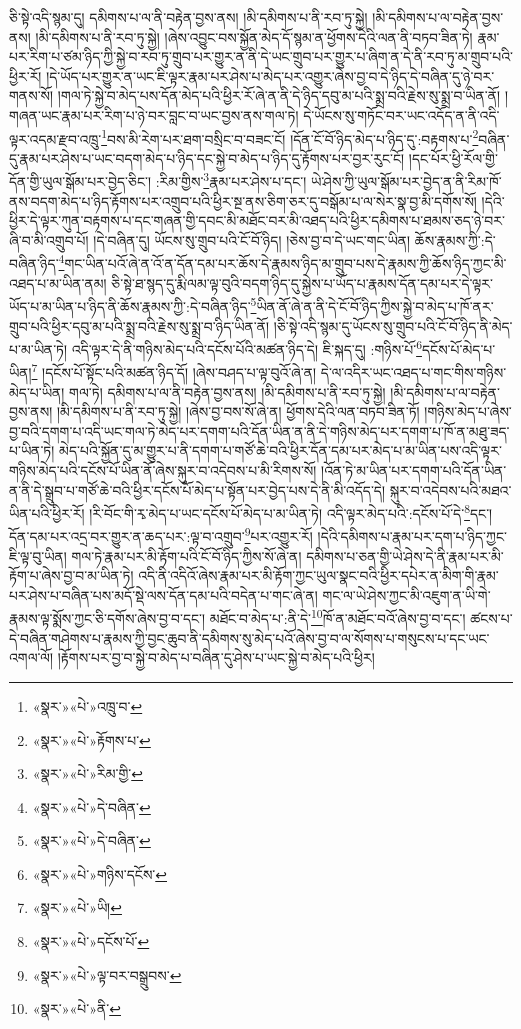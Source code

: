 ཅི་སྟེ་འདི་སྙམ་དུ། དམིགས་པ་ལ་ནི་བརྟེན་བྱས་ནས། །མི་དམིགས་པ་ནི་རབ་ཏུ་སྐྱེ། །མི་དམིགས་པ་ལ་བརྟེན་བྱས་ནས། །མི་དམིགས་པ་ནི་རབ་ཏུ་སྐྱེ། །ཞེས་འབྱུང་བས་སྐྱོན་མེད་དོ་སྙམ་ན་ཕྱོགས་དེའི་ལན་ནི་བཏབ་ཟིན་ཏེ། རྣམ་པར་རིག་པ་ཙམ་ཉིད་ཀྱི་སྐྱེ་བ་རབ་ཏུ་གྲུབ་པར་གྱུར་ན་ནི་དེ་ཡང་གྲུབ་པར་གྱུར་པ་ཞིག་ན་དེ་ནི་རབ་ཏུ་མ་གྲུབ་པའི་ཕྱིར་རོ། །དེ་ཡོད་པར་གྱུར་ན་ཡང་ཇི་ལྟར་རྣམ་པར་ཤེས་པ་མེད་པར་འགྱུར་ཞེས་བྱ་བ་དེ་ཉིད་དེ་བཞིན་དུ་ཉེ་བར་གནས་སོ། །གལ་ཏེ་སྐྱེ་བ་མེད་པས་དོན་མེད་པའི་ཕྱིར་རོ་ཞེ་ན་ནི་དེ་ཉིད་དབུ་མ་པའི་སྨྲ་བའི་རྗེས་སུ་སྨྲ་བ་ཡིན་ནོ། །གཞན་ཡང་རྣམ་པར་རིག་པ་ཉེ་བར་བླང་བ་ཡང་བྱས་ནས་གལ་ཏེ། དེ་ཡོངས་སུ་གཏོང་བར་ཡང་འདོད་ན་ནི་འདི་ལྟར་འདམ་རྫབ་འཁྲུ་\footnote{«སྣར་»«པེ་»འཁྲུ་བ་}བས་མི་རེག་པར་ཐག་བསྲིང་བ་བཟང་ངོ། །དོན་ངོ་བོ་ཉིད་མེད་པ་ཉིད་དུ་:བརྟགས་པ་\footnote{«སྣར་»«པེ་»རྟོགས་པ་}བཞིན་དུ་རྣམ་པར་ཤེས་པ་ཡང་བདག་མེད་པ་ཉིད་དང་སྐྱེ་བ་མེད་པ་ཉིད་དུ་རྟོགས་པར་བྱར་རུང་ངོ། །དང་པོར་ཕྱི་རོལ་གྱི་དོན་གྱི་ཡུལ་སྒོམ་པར་བྱེད་ཅིང་། :རིམ་གྱིས་\footnote{«སྣར་»«པེ་»རིམ་གྱི་}རྣམ་པར་ཤེས་པ་དང་། ཡེ་ཤེས་ཀྱི་ཡུལ་སྒོམ་པར་བྱེད་ན་ནི་རིམ་ཁོ་ནས་བདག་མེད་པ་ཉིད་རྟོགས་པར་འགྲུབ་པའི་ཕྱིར་སྔ་ནས་ཅིག་ཅར་དུ་བསྒོམ་པ་ལ་སེར་སྣ་བྱ་མི་དགོས་སོ། །དེའི་ཕྱིར་དེ་ལྟར་ཀུན་བརྟགས་པ་དང་གཞན་གྱི་དབང་མི་མཐོང་བར་མི་འཐད་པའི་ཕྱིར་དམིགས་པ་ཐམས་ཅད་ཉེ་བར་ཞི་བ་མི་འགྲུབ་པོ། །དེ་བཞིན་དུ། ཡོངས་སུ་གྲུབ་པའི་ངོ་བོ་ཉིད། །ཅེས་བྱ་བ་དེ་ཡང་གང་ཡིན། ཆོས་རྣམས་ཀྱི་:དེ་བཞིན་ཉིད་\footnote{«སྣར་»«པེ་»དེ་བཞིན་}གང་ཡིན་པའོ་ཞེ་ན་འོ་ན་དོན་དམ་པར་ཆོས་དེ་རྣམས་ཉིད་མ་གྲུབ་པས་དེ་རྣམས་ཀྱི་ཆོས་ཉིད་ཀྱང་མི་འཐད་པ་མ་ཡིན་ནམ། ཅི་སྟེ་ཐ་སྙད་དུ་རྨི་ལམ་ལྟ་བུའི་བདག་ཉིད་དུ་སྐྱེས་པ་ཡོད་པ་རྣམས་དོན་དམ་པར་དེ་ལྟར་ཡོད་པ་མ་ཡིན་པ་ཉིད་ནི་ཆོས་རྣམས་ཀྱི་:དེ་བཞིན་ཉིད་\footnote{«སྣར་»«པེ་»དེ་བཞིན་}ཡིན་ནོ་ཞེ་ན་ནི་དེ་ངོ་བོ་ཉིད་ཀྱིས་སྐྱེ་བ་མེད་པ་ཁོ་ནར་གྲུབ་པའི་ཕྱིར་དབུ་མ་པའི་སྨྲ་བའི་རྗེས་སུ་སྨྲ་བ་ཉིད་ཡིན་ནོ། །ཅི་སྟེ་འདི་སྙམ་དུ་ཡོངས་སུ་གྲུབ་པའི་ངོ་བོ་ཉིད་ནི་མེད་པ་མ་ཡིན་ཏེ། འདི་ལྟར་དེ་ནི་གཉིས་མེད་པའི་དངོས་པོའི་མཚན་ཉིད་དེ། ཇི་སྐད་དུ། :གཉིས་པོ་\footnote{«སྣར་»«པེ་»གཉིས་དངོས་}དངོས་པོ་མེད་པ་ཡིན།\footnote{«སྣར་»«པེ་»ཡི།} །དངོས་པོ་སྟོང་པའི་མཚན་ཉིད་དོ། །ཞེས་བཤད་པ་ལྟ་བུའོ་ཞེ་ན། དེ་ལ་འདིར་ཡང་འཐད་པ་གང་གིས་གཉིས་མེད་པ་ཡིན། གལ་ཏེ། དམིགས་པ་ལ་ནི་བརྟེན་བྱས་ནས། །མི་དམིགས་པ་ནི་རབ་ཏུ་སྐྱེ། །མི་དམིགས་པ་ལ་བརྟེན་བྱས་ནས། །མི་དམིགས་པ་ནི་རབ་ཏུ་སྐྱེ། །ཞེས་བྱ་བས་སོ་ཞེ་ན། ཕྱོགས་དེའི་ལན་བཏབ་ཟིན་ཏོ། །གཉིས་མེད་པ་ཞེས་བྱ་བའི་དགག་པ་འདི་ཡང་གལ་ཏེ་མེད་པར་དགག་པའི་དོན་ཡིན་ན་ནི་དེ་གཉིས་མེད་པར་དགག་པ་ཁོ་ན་མཐུ་ཟད་པ་ཡིན་ཏེ། མེད་པའི་སྐྱོན་དུ་མ་གྱུར་པ་ནི་དགག་པ་གཙོ་ཆེ་བའི་ཕྱིར་དོན་དམ་པར་མེད་པ་མ་ཡིན་པས་འདི་ལྟར་གཉིས་མེད་པའི་དངོས་པོ་ཡིན་ནོ་ཞེས་སྐུར་བ་འདེབས་པ་མི་རིགས་སོ། །འོན་ཏེ་མ་ཡིན་པར་དགག་པའི་དོན་ཡིན་ན་ནི་དེ་སྒྲུབ་པ་གཙོ་ཆེ་བའི་ཕྱིར་དངོས་པོ་མེད་པ་སྟོན་པར་བྱེད་པས་དེ་ནི་མི་འདོད་དེ། སྐུར་བ་འདེབས་པའི་མཐའ་ཡིན་པའི་ཕྱིར་རོ། །རི་བོང་གི་རྭ་མེད་པ་ཡང་དངོས་པོ་མེད་པ་མ་ཡིན་ཏེ། འདི་ལྟར་མེད་པའི་:དངོས་པོ་དེ་\footnote{«སྣར་»«པེ་»དངོས་པོ་}དང་། དོན་དམ་པར་འདྲ་བར་གྱུར་ན་ཆད་པར་:ལྟ་བ་འགྲུབ་\footnote{«སྣར་»«པེ་»ལྟ་བར་བསྒྲུབས་}པར་འགྱུར་རོ། །དེའི་དམིགས་པ་རྣམ་པར་དག་པ་ཉིད་ཀྱང་ཇི་ལྟ་བུ་ཡིན། གལ་ཏེ་རྣམ་པར་མི་རྟོག་པའི་ངོ་བོ་ཉིད་ཀྱིས་སོ་ཞེ་ན། དམིགས་པ་ཅན་གྱི་ཡེ་ཤེས་དེ་ནི་རྣམ་པར་མི་རྟོག་པ་ཞེས་བྱ་བ་མ་ཡིན་ཏེ། འདི་ནི་འདིའོ་ཞེས་རྣམ་པར་མི་རྟོག་ཀྱང་ཡུལ་སྣང་བའི་ཕྱིར་དཔེར་ན་མིག་གི་རྣམ་པར་ཤེས་པ་བཞིན་པས་མདོ་སྡེ་ལས་དོན་དམ་པའི་བདེན་པ་གང་ཞེ་ན། གང་ལ་ཡེ་ཤེས་ཀྱང་མི་འཇུག་ན་ཡི་གེ་རྣམས་ལྟ་སྨོས་ཀྱང་ཅི་དགོས་ཞེས་བྱ་བ་དང་། མཐོང་བ་མེད་པ་:ནི་དེ་\footnote{«སྣར་»«པེ་»ནི་}ཁོ་ན་མཐོང་བའོ་ཞེས་བྱ་བ་དང་། ཚངས་པ་དེ་བཞིན་གཤེགས་པ་རྣམས་ཀྱི་བྱང་ཆུབ་ནི་དམིགས་སུ་མེད་པའོ་ཞེས་བྱ་བ་ལ་སོགས་པ་གསུངས་པ་དང་ཡང་འགལ་ལོ། །རྟོགས་པར་བྱ་བ་སྐྱེ་བ་མེད་པ་བཞིན་དུ་ཤེས་པ་ཡང་སྐྱེ་བ་མེད་པའི་ཕྱིར། 